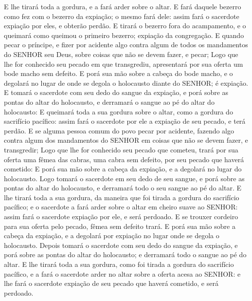 {{  E lhe tirará toda a gordura, e a fará arder sobre o altar.
  E fará daquele bezerro como fez com o bezerro da expiação; o mesmo fará dele: assim fará o sacerdote expiação por eles, e obterão perdão.
  E tirará o bezerro fora do acampamento, e o queimará como queimou o primeiro bezerro; expiação da congregação.
  E quando pecar o príncipe, e fizer por acidente algo contra algum de todos os mandamentos do SENHOR seu Deus, sobre coisas que não se devem fazer, e pecar;
  Logo que lhe for conhecido seu pecado em que transgrediu, apresentará por sua oferta um bode macho sem defeito.
  E porá sua mão sobre a cabeça do bode macho, e o degolará no lugar de onde se degola o holocausto diante do SENHOR; é expiação.
  E tomará o sacerdote com seu dedo do sangue da expiação, e porá sobre as pontas do altar do holocausto, e derramará o sangue ao pé do altar do holocausto:
  E queimará toda a sua gordura sobre o altar, como a gordura do sacrifício pacífico: assim fará o sacerdote por ele a expiação de seu pecado, e terá perdão.
  E se alguma pessoa comum do povo pecar por acidente, fazendo algo contra algum dos mandamentos do SENHOR em coisas que não se devem fazer, e transgredir;
  Logo que lhe for conhecido seu pecado que cometeu, trará por sua oferta uma fêmea das cabras, uma cabra sem defeito, por seu pecado que haverá cometido:
  E porá sua mão sobre a cabeça da expiação, e a degolará no lugar do holocausto.
  Logo tomará o sacerdote em seu dedo de seu sangue, e porá sobre as pontas do altar do holocausto, e derramará todo o seu sangue ao pé do altar.
  E lhe tirará toda a sua gordura, da maneira que foi tirada a gordura do sacrifício pacífico; e o sacerdote a fará arder sobre o altar em cheiro suave ao SENHOR: assim fará o sacerdote expiação por ele, e será perdoado.
  E se trouxer cordeiro para sua oferta pelo pecado, fêmea sem defeito trará.
  E porá sua mão sobre a cabeça da expiação, e a degolará por expiação no lugar onde se degola o holocausto.
  Depois tomará o sacerdote com seu dedo do sangue da expiação, e porá sobre as pontas do altar do holocausto; e derramará todo o sangue ao pé do altar.
  E lhe tirará toda a sua gordura, como foi tirada a gordura do sacrifício pacífico, e a fará o sacerdote arder no altar sobre a oferta acesa ao SENHOR: e lhe fará o sacerdote expiação de seu pecado que haverá cometido, e será perdoado}.
\par }

